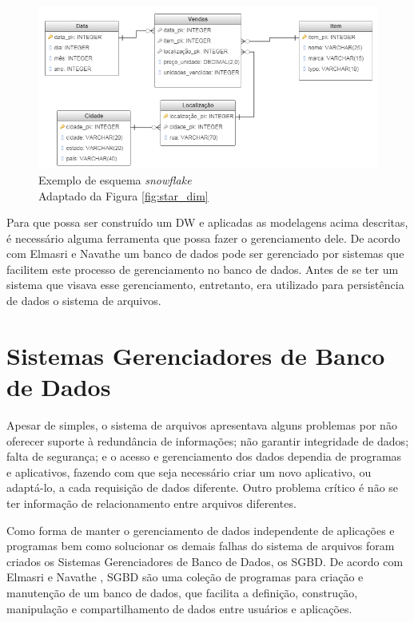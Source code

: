 \begin{figure}[htpb]
	\centering
		\includegraphics[width=13cm]{img/snow}
    \caption[Exemplo de esquema \textit{snowflake}]{Exemplo de esquema \textit{snowflake} \\ Adaptado da Figura \ref{fig:star_dim}}
	\label{fig:snow}
\end{figure}

Para que possa ser construído um DW e aplicadas as modelagens acima descritas, 
é necessário alguma ferramenta que possa fazer o gerenciamento dele. 
De acordo com Elmasri e Navathe \cite{navathe2011banco} um banco de dados pode ser gerenciado por sistemas que 
facilitem este processo de gerenciamento no banco de dados. Antes de se ter um sistema que visava esse gerenciamento, entretanto, era utilizado para persistência de dados o sistema de arquivos. 

\section{Sistemas Gerenciadores de Banco de Dados}

Apesar de simples, o sistema de arquivos apresentava alguns problemas por não oferecer suporte à redundância de informações; não garantir integridade de dados; 
falta de segurança; e o acesso e gerenciamento dos dados dependia de programas e aplicativos, fazendo com que seja necessário criar um novo aplicativo, ou adaptá-lo, a 
cada requisição de dados diferente. Outro problema crítico é não se ter informação de relacionamento entre arquivos diferentes.

Como forma de manter o gerenciamento de dados independente de aplicações e programas bem como solucionar os demais falhas do sistema de arquivos 
foram criados os Sistemas Gerenciadores de Banco de Dados, os SGBD. De acordo com Elmasri e Navathe \cite{navathe2011banco}, SGBD são uma coleção de programas para 
criação e manutenção de um banco de dados, que facilita a definição, construção, manipulação e compartilhamento de dados entre usuários e aplicações.

